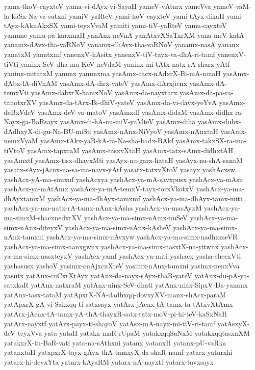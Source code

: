 {yama-thoV-cayxteV
yama-vi-dAyx-vi-SayaH
yameV-vAtarx
yameVva
yameV-vaM-la-kaSx-Na-va-sutxni
yamiV-yaRteV
yami-hoV-cayxteV
yami-tAyx-dikaH
yami-tAyx-kAknAkxSX
yami-teyxVvaM
yamiti
yami-tiV-yaRteV
yamu-cayxteV
yamune
yamu-pa-karxmaH
yanAnx-neVnA
yanAtxvXSaTxrXM
yana-meV-katA
yanamx-dAvx-tha-vaRNoV
yanamx-dhAvx-tha-vaRNoV
yanamx-nasA
yananx
yanatxM
yanatxmf
yanenxV-hAsitx
yanenxV-tiV-tayx-va-dhA-ri-tamf
yanenxV-tiVti
yaninx-SeV-dha-mu-KeV-neVdaM
yaninx-mi-tAtx-natx-rA-sharx-yAtf
yaninx-mitatxM
yanunx
yanunxma
yasAmx-cacx-nAdxrX-Bi-mA-ninaH
yasAmx-dAbx-lA-diVnAM
yasAmx-dA-dirx-yateV
yasAmx-dArxjicnx
yasAmx-dA-temxVti
yasAmx-dabxrX-hamxNoV
yasAmx-da-nayxtarx
yasAmx-da-pa-ra-tanotxrXV
yasAmx-da-tArx-Bi-dhiV-yateV
yasAmx-da-vi-dayx-yeYvA
yasAmx-deBxVdeV
yasAmx-deV-va-matoV
yasAmxdf
yasAmx-didaM
yasAmx-didhx-ra-Nayx-ga-BaRsayx
yasAmx-di-hA-nu-miV-yaMteV
yasAmx-diha
yasAmx-dubx-dAdhxyX-di-gu-Na-BU-miSu
yasAmx-nAnx-NiVyoV
yasAmx-nAnxtaH
yasAmx-nemxVyaM
yasAmx-tAkx-yaR-kA-ra-Na-sha-badx-BAkf
yasAmx-takxSX-ra-ma-tiVtoV
yasAmx-tapxraM
yasAmx-tasxvXtaH
yasAmx-tatx-sAmx-didhxtAH
yasAmxtf
yasAmx-tisx-dhayxMti
yasAyx-nu-garx-hataH
yasAyx-nu-shA-sanaM
yasatx-sAyx-jAcnx-na-sa-ma-navx-yAtf
yasatx-tatxvXtoV
yasayx
yashAcxsw
yashAcx-yA-ma-simxnf
yashAcxya
yashAcx-ya-mA-savxpusx
yashAcx-ya-mAsu
yashAcx-ya-mAtAmx
yashAcx-ya-mA-temxV-tayx-torxVkotxV
yashAcx-ya-ma-dhAyxtamxM
yashAcx-ya-ma-dhAyx-tamxmf
yashAcx-ya-ma-dhAyx-tamx-miti
yashAcx-ya-ma-natx-rA-tamx-nAnx-kAsha
yashAcx-ya-masAyxM
yashAcx-ya-ma-simxM-shacxnedxrXV
yashAcx-ya-ma-simx-nAmx-nuSeV
yashAcx-ya-ma-simx-nAnx-diteyxV
yashAcx-ya-ma-simx-nAnx-kAsheV
yashAcx-ya-ma-simx-nAnx-tamxni
yashAcx-ya-ma-simx-nAvxyw
yashAcx-ya-ma-simx-nadhxmeVR
yashAcx-ya-ma-simx-nanxgwnx
yashAcx-ya-ma-simx-nasxtX-na-yitwnx
yashAcx-ya-ma-simx-nasxteyxV
yashAcx-yamf
yashAcx-ya-miti
yashacx
yasha-shecxVti
yashasusx
yashoV
yasimx-cnAjxcnXteV
yasimx-nAnx-tamxni
yasimx-nenxVva
yasutx
yatAnx-cuCxrXtAyx
yatAnx-da-nayx-sAyx-thaR-yateV
yatAnx-du-pA-ya-satxkaR
yatAnx-natxraM
yatAnx-ninx-SeV-dhati
yatAnx-ninx-SipxV-Da-yananx
yatAnx-tasx-tataM
yatApxrX-NA-dadhxqq-dovxyXV-manx-shAcx-paraM
yatApxrX-gA-vi-Sakxqq-ti-satxsayx
yatArx-jAcnx-tA-tamx-ta-tAtxvXtAmx
yatArx-jAcnx-tA-tamx-yA-thA-thayxR-satx-tatx-moV-pi-hi-teV-kaSxNaH
yatArx-nayxtf
yatArx-payx-ti-shayoV
yatAsx-mA-nayx-mi-tiV-ri-tamf
yatAsxyX-deV-teyxVva
yata
yataH
yatakx-maR-rUpaM
yatakxqqSaNxM
yatakxqqtasxnXM
yatakxrX-tu-BaR-vati
yata-na-sAthxni
yatanx
yatanxH
yatanx-pU-vaRka
yatanxtaH
yatapxrX-tayx-gAyx-thA-tamxyX-da-shaR-namf
yatarx
yatarxhi
yatarx-hi-devxYta
yatarx-kAyaRM
yatarx-nA-nayxtf
yatarx-tavxsayx
}
